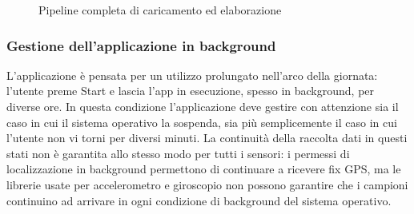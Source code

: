\documentclass[conference]{IEEEtran}
\begin{document}
\begin{figure}[t]
\centering
{}
\caption{Pipeline completa di caricamento ed elaborazione}
\label{fig:pipeline-timeline}
\end{figure}

\subsubsection{Gestione dell'applicazione in background}

L'applicazione è pensata per un utilizzo prolungato nell'arco della
giornata: l'utente preme Start e lascia l'app in esecuzione, spesso in
background, per diverse ore. In questa condizione l'applicazione deve
gestire con attenzione sia il caso in cui il sistema operativo la
sospenda, sia più semplicemente il caso in cui l'utente non vi torni
per diversi minuti. La continuità della raccolta dati in questi stati
non è garantita allo stesso modo per tutti i sensori: i permessi di
localizzazione in background permettono di continuare a ricevere fix
GPS, ma le librerie usate per accelerometro e giroscopio non possono
garantire che i campioni continuino ad arrivare in ogni condizione di
background del sistema operativo.
\end{document}
